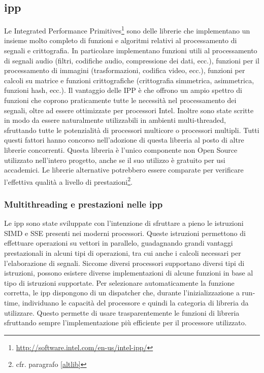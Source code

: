 \subsection{\ac{ipp}}
Le Integrated Performance
Primitives\footnote{\url{http://software.intel.com/en-us/intel-ipp/}} sono delle
librerie che implementano un insieme molto completo di funzioni e algoritmi
relativi al processamento di segnali e crittografia. In particolare implementano
funzioni utili al processamento di segnali audio (filtri, codifiche audio,
compressione dei dati, ecc.), funzioni per il processamento di immagini
(trasformazioni, codifica video, ecc.), funzioni per calcoli su matrice e
funzioni crittografiche (crittografia simmetrica, asimmetrica, funzioni hash,
ecc.).  Il vantaggio delle IPP \`e che offrono un ampio spettro di funzioni che
coprono praticamente tutte le necessit\`a nel processamento dei segnali, oltre
ad essere ottimizzate per processori Intel. Inoltre sono state scritte in modo
da essere naturalmente utilizzabili in ambienti multi-threaded, sfruttando tutte
le potenzialit\`a di processori multicore o processori multipli. Tutti questi
fattori hanno concorso nell'adozione di questa libreria al posto di altre
librerie concorrenti. Questa libreria \`e l'unico componente non Open Source
utilizzato nell'intero progetto, anche se il suo utilizzo \`e gratuito per usi
accademici. Le librerie alternative potrebbero essere comparate per verificare
l'effettiva qualit\`a a livello di prestazioni\footnote{cfr. paragrafo
\ref{altlib}}.

\subsubsection{Multithreading e prestazioni nelle \ac{ipp}}
Le \ac{ipp} sono state sviluppate con l'intenzione di sfruttare a pieno le
istruzioni \ac{SIMD} e \ac{SSE} presenti nei moderni processori. Queste
istruzioni permettono di effettuare operazioni su vettori in parallelo,
guadagnando grandi vantaggi prestazionali in alcuni tipi di operazioni, tra cui
anche i calcoli necessari per l'elaborazione di segnali. Siccome diversi
processori supportano diversi tipi di istruzioni, possono esistere diverse
implementazioni di alcune funzioni in base al tipo di istruzioni supportate. Per
selezionare automaticamente la funzione corretta, le \ac{ipp} dispongono di un
dispatcher che, durante l'inizializzazione a run-time, individuano le capacit\`a
del processore e quindi la categoria di libreria da utilizzare. Questo permette
di usare trasparentemente le funzioni di libreria sfruttando sempre
l'implementazione pi\`u efficiente per il processore utilizzato.

